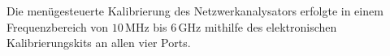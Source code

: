 Die menügesteuerte Kalibrierung des Netzwerkanalysators erfolgte in einem Frequenzbereich von
$10 \, \si{\mega\hertz}$ bis $6 \, \si{\giga\hertz}$ mithilfe des elektronischen
Kalibrierungskits an allen vier Ports. 